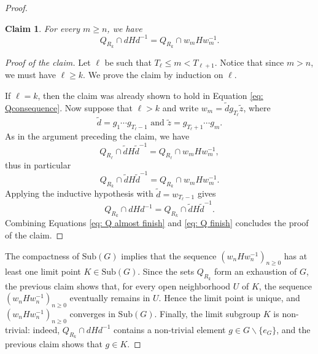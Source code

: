 \documentclass[reqno,a4paper,11pt]{amsart}
\numberwithin{equation}{section}
\newcommand{\1}{\mathbf{1}}
\newtheorem*{claim}{Claim}
\theoremstyle{definition}
\begin{document}
\begin{proof}
		\begin{claim}
			For every $m\ge n$, we have 
			\[
			Q_{R_k}\cap dHd^{-1}=Q_{R_k}\cap w_mH w_m^{-1}.
			\]
		\end{claim}
		\begin{proof}[Proof of the claim]
			Let $\ell$ be such that $T_\ell\le m < T_{\ell +1}$. Notice that since $m>n$, we must have $\ell\ge k$. We prove the claim by induction on $\ell$.
			
			If $\ell=k$, then the claim was already shown to hold in Equation \eqref{eq: Qconsequence}. Now suppose that $\ell>k$ and write $w_m=\widetilde{d}g_{T_\ell}\widetilde{z}$, where
			\[
			\widetilde{d}=g_1\cdots g_{T_\ell-1} \text{ and }\widetilde{z}=g_{T_{\ell}+1}\cdots g_m.
			\]
			As in the argument preceding the claim, we have 
			\[
			Q_{R_\ell}\cap \widetilde{d}H\widetilde{d}^{-1}=Q_{R_\ell}\cap w_m H w_m^{-1},
			\]
			thus in particular 
			\begin{equation}\label{eq: Q almost finish}
				Q_{R_k}\cap \widetilde{d}H\widetilde{d}^{-1}=Q_{R_k}\cap w_m H w_m^{-1}.
			\end{equation}
			Applying the inductive hypothesis with $\widetilde{d}=w_{T_\ell-1}$ gives
			\begin{equation}\label{eq: Q finish}
				Q_{R_k}\cap dHd^{-1}=Q_{R_k}\cap \widetilde{d}H\widetilde{d}^{-1}.
			\end{equation}
			Combining Equations \eqref{eq: Q almost finish} and \eqref{eq: Q finish} concludes the proof of the claim.
		\end{proof}
		The compactness of $\mathrm{Sub}(G)$ implies that the sequence $(w_n H w_n^{-1})_{n \ge 0}$ has at least one limit point $K \in \mathrm{Sub}(G)$. Since the sets $Q_{R_k}$ form an exhaustion of $G$, the previous claim shows that, for every open neighborhood $U$ of $K$, the sequence $(w_n H w_n^{-1})_{n \ge 0}$ eventually remains in $U$. Hence the limit point is unique, and $(w_n H w_n^{-1})_{n \ge 0}$ converges in $\mathrm{Sub}(G)$. Finally, the limit subgroup $K$ is non-trivial: indeed, $Q_{R_k} \cap d H d^{-1}$ contains a non-trivial element $g \in G \backslash \{e_G\}$, and the previous claim shows that $g \in K$.
	\end{proof}
\end{document}
